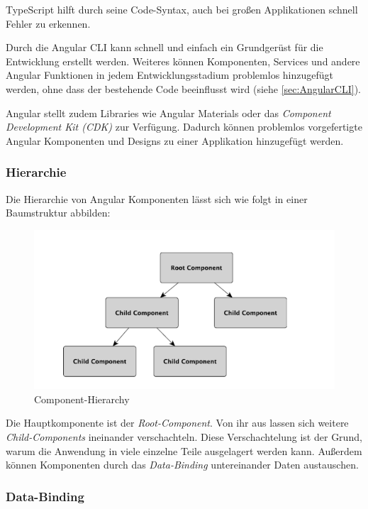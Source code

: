 TypeScript hilft durch seine Code-Syntax, auch bei großen Applikationen schnell Fehler zu erkennen. 

Durch die Angular CLI kann schnell und einfach ein Grundgerüst für die Entwicklung erstellt werden. Weiteres können Komponenten, Services und andere Angular Funktionen in jedem Entwicklungsstadium problemlos hinzugefügt werden, ohne dass der bestehende Code beeinflusst wird (siehe \ref{sec:AngularCLI}).

Angular stellt zudem Libraries wie Angular Materials oder das \emph{Component Development Kit (CDK)} zur Verfügung. Dadurch können problemlos vorgefertigte Angular Komponenten und Designs zu einer Applikation hinzugefügt werden.

\cite{AngularScaling}

\subsubsection{Hierarchie}
Die Hierarchie von Angular Komponenten lässt sich wie folgt in einer Baumstruktur abbilden:

\begin{figure}
    \centering
    \includegraphics[scale=0.6]{pics/hierarchy.PNG}
    \caption{Component-Hierarchy \cite{AngularBuch}}
    \label{fig:tech:front:component-hierarchy}
  \end{figure}
Die Hauptkomponente ist der \emph{Root-Component}. Von ihr aus lassen sich weitere \emph{Child-Components} ineinander verschachteln. Diese Verschachtelung ist der Grund, warum die Anwendung in viele einzelne Teile ausgelagert werden kann. Außerdem können Komponenten durch das \emph{Data-Binding} untereinander Daten austauschen. \cite{AngularComponentsHierarche} \cite{AngularBuch}

\subsubsection{Data-Binding }
\label{data-binding}

